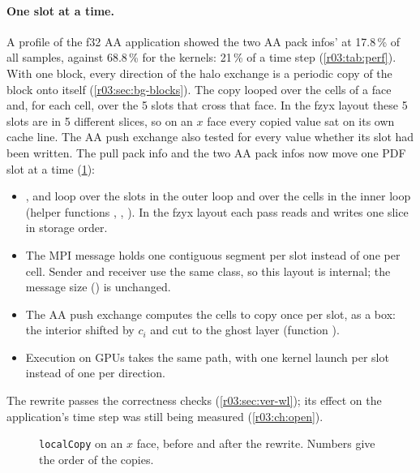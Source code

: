 \paragraph{One slot at a time.} A profile of the f32 AA application showed the two AA pack
infos'  at 17.8\,\% of all samples, against 68.8\,\% for the kernels: 21\,\% of
a time step (\cref{r03:tab:perf}). With one block, every direction of the halo exchange is a
periodic copy of the block onto itself (\cref{r03:sec:bg-blocks}). The copy looped over the
cells of a face and, for each cell, over the 5 slots that cross that face. In the fzyx layout
these 5 slots are in 5 different slices, so on an $x$ face every copied value sat on its own
cache line. The AA push exchange also tested for every value whether its slot had been written.
The pull pack info and the two AA pack infos now move one PDF slot at a time
(\cref{r03:fig:halo}):
\begin{itemize}
  \item {},  and  loop over the slots in the outer loop and
        over the cells in the inner loop (helper functions ,
        , ). In the fzyx layout each pass reads and writes one
        slice in storage order.
  \item The MPI message holds one contiguous segment per slot instead of one per cell. Sender
        and receiver use the same class, so this layout is internal; the message size
        () is unchanged.
  \item The AA push exchange computes the cells to copy once per slot, as a box: the interior
        shifted by $c_i$ and cut to the ghost layer (function ).
  \item Execution on GPUs takes the same path, with one kernel launch per slot instead of one per
        direction.
\end{itemize}
The rewrite passes the correctness checks (\cref{r03:sec:ver-wl}); its effect on the
application's time step was still being measured (\cref{r03:ch:open}).

\begin{figure}[htbp]
  \centering
  \resizebox{\linewidth}{!}{}
  \caption[Halo copy: cell by cell and slot by slot]{\texttt{localCopy} on an $x$ face, before
    and after the rewrite. Numbers give the order of the copies.}\label{r03:fig:halo}
\end{figure}

